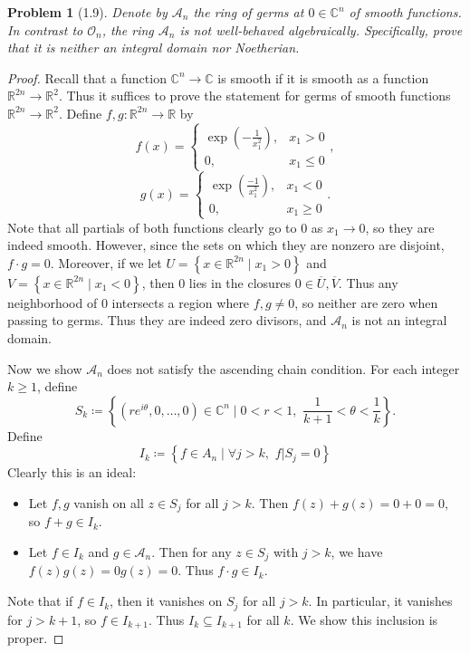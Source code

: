 \documentclass[11pt, letterpaper]{article}
\theoremstyle{plain}
\newtheorem{problem}{Problem}
\begin{document}
\begin{problem}[1.9]
	Denote by $\mathcal{A} _n$ the ring of germs at $0\in\mathbb{C} ^n$ of smooth functions. In contrast to $\mathcal{O} _n$, the ring $\mathcal{A} _n$ is not well-behaved algebraically. Specifically, prove that it is neither an integral domain nor Noetherian.
\end{problem}
\begin{proof}
	Recall that a function $\mathbb{C} ^n\to \mathbb{C} $ is smooth if it is smooth as a function $\mathbb{R} ^{2n} \to \mathbb{R} ^2$. Thus it suffices to prove the statement for germs of smooth functions $\mathbb{R} ^{2n} \to \mathbb{R} ^2$. Define $f,g : \mathbb{R} ^{2n}  \to \mathbb{R}  $ by
	\[
		f(x)=
		\begin{cases}
			\exp \left( -\frac{1}{x_1^2}  \right) ,&x_1>0\\
			0,&x_1\leq 0
		\end{cases}
	,\]
	\[
		g(x)=
		\begin{cases}
			\exp \left( \frac{-1}{x_1^2}  \right) ,&x_1<0\\
			0,&x_1 \geq 0
		\end{cases}
	.\]
	Note that all partials of both functions clearly go to 0 as $x_1\to 0$, so they are indeed smooth. However, since the sets on which they are nonzero are disjoint, $f\cdot g=0$. Moreover, if we let $U=\left\{ x\in\mathbb{R} ^{2n} \mid x_1>0 \right\} $ and $V=\left\{ x\in\mathbb{R} ^{2n} \mid x_1<0 \right\} $, then $0$ lies in the closures $0\in\overline{U} ,\overline{V} $. Thus any neighborhood of 0 intersects a region where $f,g\neq 0$, so neither are zero when passing to germs. Thus they are indeed zero divisors, and $\mathcal{A} _{n} $ is not an integral domain.

	Now we show $\mathcal{A} _{n} $ does not satisfy the ascending chain condition. For each integer $k\geq 1$, define
	\[
		S_k\coloneqq \left\{ (re^{i\theta } ,0, \ldots ,0)\in\mathbb{C} ^n\mid 0<r<1,\,\, \frac{1}{k+1} <\theta <\frac{1}{k}  \right\} 
	.\]
	Define
	\[
		I_k \coloneqq \left\{ f\in A_n \mid \forall j> k,\,\, f|S_j=0 \right\} 
	\]
	Clearly this is an ideal:
	\begin{itemize}
		\item Let $f,g$ vanish on all $z\in S_j$ for all $j>k$. Then $f(z)+g(z)=0+0=0$, so $f+g\in I_k$.
		\item Let $f\in I_k$ and $g\in \mathcal{A} _n$. Then for any $z\in S_j$ with $j>k$, we have $f(z)g(z)=0g(z)=0$. Thus $f\cdot g\in I_k$.
	\end{itemize}
	Note that if $f\in I_{k} $, then it vanishes on $S_j$ for all $j>k$. In particular, it vanishes for $j>k+1$, so $f\in I_{k+1} $. Thus $I_k \subseteq I_{k+1} $ for all $k$. We show this inclusion is proper.


\end{proof}
\end{document}

